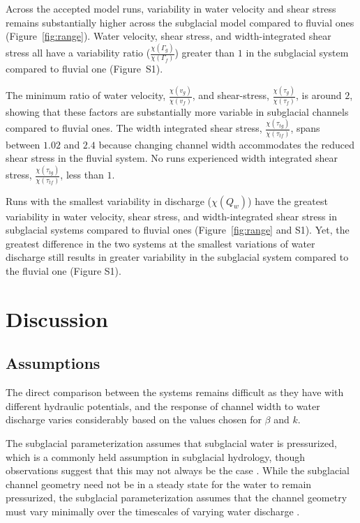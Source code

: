 \documentclass[11pt]{article}
\begin{document}
\begin{spacing}{1}
          Across the accepted model runs, variability in water velocity and shear stress remains substantially higher across the subglacial model compared to fluvial ones (Figure~\ref{fig:range}).
          Water velocity, shear stress, and width-integrated shear stress all have a variability ratio ($\frac{\chi(\Gamma_{g})}{\chi(\Gamma_f)}$) greater than $1$ in the subglacial  system compared to fluvial one (Figure~S1).
          
          The minimum ratio of  water velocity, $\frac{\chi(v_{g})}{\chi(v_{f})}$, and shear-stress, $\frac{\chi(\tau_{g})}{\chi(\tau_{f})}$, is around $2$, showing that these factors are substantially more variable in subglacial channels compared to fluvial ones.
          The width integrated shear stress, $\frac{\chi(\tau_{tg})}{\chi( \tau_{tf})}$, spans between $1.02$ and $2.4$ because changing channel width accommodates the reduced shear stress in the fluvial system.
          No runs experienced width integrated shear stress, $\frac{\chi(\tau_{tg})}{\chi( \tau_{tf})}$, less than $1$.
          
          Runs with the smallest variability in discharge ($\chi(Q_w)$) have the greatest variability in water velocity, shear stress, and width-integrated shear stress in subglacial systems compared to fluvial ones (Figure~\ref{fig:range} and S1).
          Yet, the greatest difference in the two systems at the smallest variations of water discharge still results in greater variability in the subglacial system compared to the fluvial one (Figure S1). 

        
          \section{Discussion}
          \subsection{Assumptions}
        
          The direct comparison between the systems remains difficult as they have with different hydraulic potentials, and the response of channel width to water discharge varies considerably based on the values chosen for $\beta$ and $k$.
        
          The subglacial parameterization assumes that subglacial water is pressurized, which is a commonly held assumption in subglacial hydrology, though observations suggest that this may not always be the case \citep[e.g.][]{gimbert2016}.
          While the subglacial channel geometry need not be in a steady state for the water to remain pressurized, the subglacial parameterization assumes that the channel geometry must vary minimally over the timescales of varying  water discharge \citep[e.g.][]{nanni2020}.
          

\end{spacing}
\end{document}
